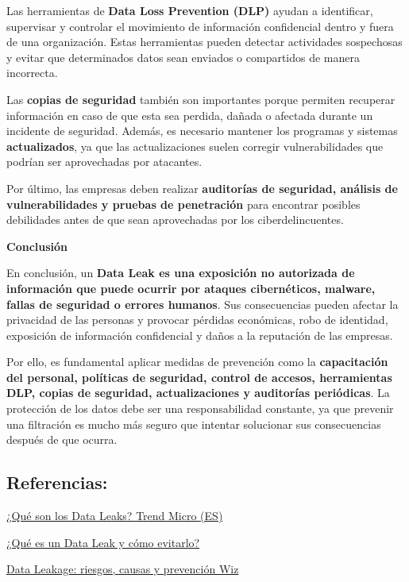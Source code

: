 \documentclass[]{article}
\begin{document}
Las herramientas de \textbf{Data Loss Prevention (DLP)} ayudan a
identificar, supervisar y controlar el movimiento de información
confidencial dentro y fuera de una organización. Estas herramientas
pueden detectar actividades sospechosas y evitar que determinados datos
sean enviados o compartidos de manera incorrecta.

Las \textbf{copias de seguridad} también son importantes porque permiten
recuperar información en caso de que esta sea perdida, dañada o afectada
durante un incidente de seguridad. Además, es necesario mantener los
programas y sistemas \textbf{actualizados}, ya que las actualizaciones
suelen corregir vulnerabilidades que podrían ser aprovechadas por
atacantes.

Por último, las empresas deben realizar \textbf{auditorías de seguridad,
análisis de vulnerabilidades y pruebas de penetración} para encontrar
posibles debilidades antes de que sean aprovechadas por los
ciberdelincuentes.

\textbf{Conclusión}

En conclusión, un \textbf{Data Leak es una exposición no autorizada de
información que puede ocurrir por ataques cibernéticos, malware, fallas
de seguridad o errores humanos}. Sus consecuencias pueden afectar la
privacidad de las personas y provocar pérdidas económicas, robo de
identidad, exposición de información confidencial y daños a la
reputación de las empresas.

Por ello, es fundamental aplicar medidas de prevención como la
\textbf{capacitación del personal, políticas de seguridad, control de
accesos, herramientas DLP, copias de seguridad, actualizaciones y
auditorías periódicas}. La protección de los datos debe ser una
responsabilidad constante, ya que prevenir una filtración es mucho más
seguro que intentar solucionar sus consecuencias después de que ocurra.

\subsection{Referencias:}\label{referencias-2}

\href{https://www.trendmicro.com/es_es/what-is/data-breach/data-leak.html}{¿Qué
son los Data Leaks? \textbar{} Trend Micro (ES)}

\href{https://blog.tecnetone.com/garantizando-la-seguridad-de-tus-datos-ante-un-data-leak}{¿Qué
es un Data Leak y cómo evitarlo?}

\href{https://www.wiz.io/es-es/academy/data-security/data-leakage}{Data
Leakage: riesgos, causas y prevención \textbar{} Wiz}
\end{document}

